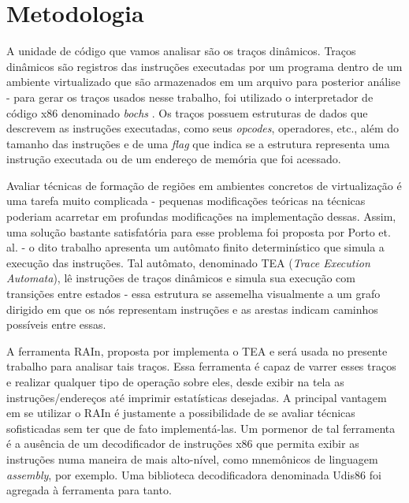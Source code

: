 \documentclass[12pt,twoside]{article}
\begin{document}
\section{Metodologia}
\label{sec-metodologia}
A unidade de código que vamos analisar são os traços dinâmicos. Traços dinâmicos são registros das instruções executadas por um programa dentro de um ambiente virtualizado que são armazenados em um arquivo para posterior análise - para gerar os traços usados nesse trabalho, foi utilizado o interpretador de código x86 denominado \emph{bochs} \cite{bochs-url}. Os traços possuem estruturas de dados que descrevem as instruções executadas, como seus \emph{opcodes}, operadores, etc., além do tamanho das instruções e de uma \emph{flag} que indica se a estrutura representa uma instrução executada ou de um endereço de memória que foi acessado.

Avaliar técnicas de formação de regiões em ambientes concretos de virtualização é uma tarefa muito complicada - pequenas modificações teóricas na técnicas poderiam acarretar em profundas modificações na implementação dessas. Assim, uma solução bastante satisfatória para esse problema foi proposta por Porto et. al. \cite{guido-2012} - o dito trabalho apresenta um autômato finito determinístico que simula a execução das instruções. Tal autômato, denominado TEA (\emph{Trace Execution Automata}), lê instruções de traços dinâmicos e simula sua execução com transições entre estados - essa estrutura se assemelha visualmente a um grafo dirigido em que os nós representam instruções e as arestas indicam caminhos possíveis entre essas.

A ferramenta RAIn, proposta por \cite{thesis-zinsly} implementa o TEA e será usada no presente trabalho para analisar tais traços. Essa ferramenta é capaz de varrer esses traços e realizar qualquer tipo de operação sobre eles, desde exibir na tela as instruções/endereços até imprimir estatísticas desejadas. A principal vantagem em se utilizar o RAIn é justamente a possibilidade de se avaliar técnicas sofisticadas sem ter que de fato implementá-las. Um pormenor de tal ferramenta é a ausência de um decodificador de instruções x86 que permita exibir as instruções numa maneira de mais alto-nível, como mnemônicos de linguagem \emph{assembly}, por exemplo. Uma biblioteca decodificadora denominada Udis86 \cite{udis86-url} foi agregada à ferramenta para tanto.
\end{document}
